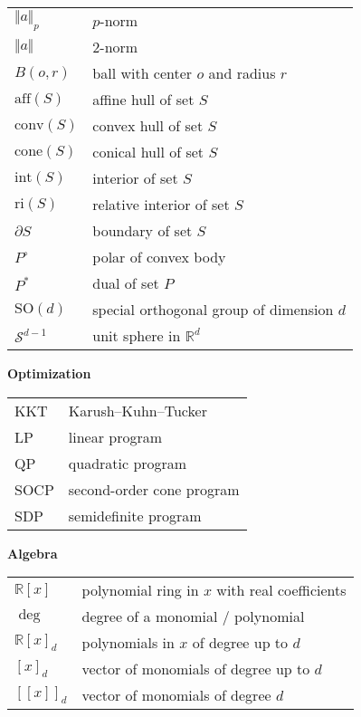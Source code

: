 \documentclass[
]{book}
\theoremstyle{definition}
\theoremstyle{definition}
\theoremstyle{definition}
\theoremstyle{definition}
\theoremstyle{remark}
\begin{document}
\begin{longtable}[]{@{}ll@{}}
\toprule()
\endhead
\(\Vert a \Vert_{p}\) & \(p\)-norm \\
\(\Vert a \Vert\) & \(2\)-norm \\
\(B(o,r)\) & ball with center \(o\) and radius \(r\) \\
\(\mathrm{aff}(S)\) & affine hull of set \(S\) \\
\(\mathrm{conv}(S)\) & convex hull of set \(S\) \\
\(\mathrm{cone}(S)\) & conical hull of set \(S\) \\
\(\mathrm{int}(S)\) & interior of set \(S\) \\
\(\mathrm{ri}(S)\) & relative interior of set \(S\) \\
\(\partial S\) & boundary of set \(S\) \\
\(P^\circ\) & polar of convex body \\
\(P^{*}\) & dual of set \(P\) \\
\(\mathrm{SO}(d)\) & special orthogonal group of dimension \(d\) \\
\(\mathcal{S}^{d-1}\) & unit sphere in \(\mathbb{R}^{d}\) \\
\bottomrule()
\end{longtable}

\textbf{Optimization}

\begin{longtable}[]{@{}ll@{}}
\toprule()
\endhead
KKT & Karush--Kuhn--Tucker \\
LP & linear program \\
QP & quadratic program \\
SOCP & second-order cone program \\
SDP & semidefinite program \\
\bottomrule()
\end{longtable}

\textbf{Algebra}

\begin{longtable}[]{@{}ll@{}}
\toprule()
\endhead
\(\mathbb{R}[x]\) & polynomial ring in \(x\) with real coefficients \\
\(\deg\) & degree of a monomial / polynomial \\
\(\mathbb{R}[x]_d\) & polynomials in \(x\) of degree up to \(d\) \\
\([x]_d\) & vector of monomials of degree up to \(d\) \\
\([\![x ]\!]_d\) & vector of monomials of degree \(d\) \\
\bottomrule()
\end{longtable}
\end{document}
